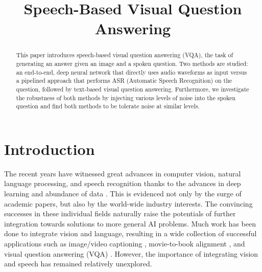 \documentclass[letterpaper]{article} %
\begin{document}
\title{Speech-Based Visual Question Answering}




\maketitle
\begin{abstract}
This paper introduces speech-based visual question answering (VQA), the task of generating an answer given an image and a spoken question. Two methods are studied: an end-to-end, deep neural network that directly uses audio waveforms as input versus a pipelined approach that performs ASR (Automatic Speech Recognition) on the question, followed by text-based visual question answering. Furthermore, we investigate the robustness of both methods by injecting various levels of noise into the spoken question and find both methods to be tolerate noise at similar levels.
\end{abstract}


\section{Introduction}
The recent years have witnessed great advances in computer vision, natural language processing, and speech recognition thanks to the advances in deep learning \cite{lecun2015deep} and abundance of data \cite{imagenet:2015}. This is evidenced not only by the surge of academic papers, but also by the world-wide industry interests. The convincing successes in these individual fields naturally raise the potentials of further integration towards solutions to more general AI problems. Much work has been done to integrate vision and language, resulting in a wide collection of successful applications such as image/video captioning \cite{show:tell:caption}, movie-to-book alignment \cite{align:bookmovie}, and visual question answering (VQA) \cite{VQA}. However, the importance of integrating vision and speech has remained relatively unexplored.
\end{document}
